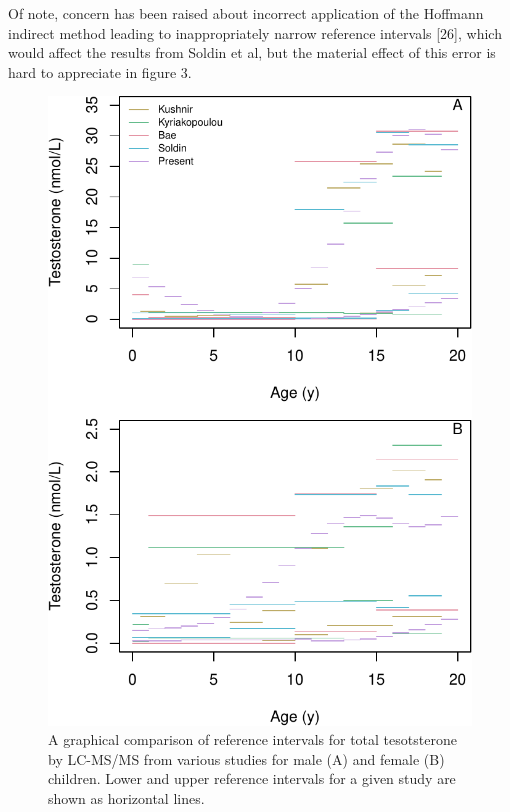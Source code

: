\documentclass[]{elsarticle} %
\begin{document}
Of note, concern has been raised about incorrect application of the
Hoffmann indirect method leading to inappropriately narrow reference
intervals {[}26{]}, which would affect the results from Soldin et al,
but the material effect of this error is hard to appreciate in figure 3.

\begin{figure}[H]
\includegraphics{comparisonfig3-1} \caption{\label{fig:fig3}A graphical comparison of reference intervals for total tesotsterone by LC-MS/MS from various studies for male (A) and female (B) children. Lower and upper reference intervals for a given study are shown as horizontal lines.}\label{fig:comparisonfig3}
\end{figure}
\end{document}
